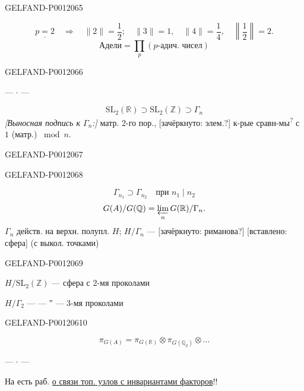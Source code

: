 \begin{GelfandAdjacentEvidence}{GELFAND-P001206}{5}

\[
\underline{p=2}\quad\Rightarrow\quad
\|2\|=\frac12;\quad\|3\|=1,\quad\|4\|=\frac14,\quad
\left\|\frac12\right\|=2.
\]
\[
\text{Адели}=\prod_p(\text{\(p\)-адич. чисел})
\]
\end{GelfandAdjacentEvidence}
\begin{GelfandAdjacentEvidence}{GELFAND-P001206}{6}

\begin{center}--- \(\cdot\) ---\end{center}
\[
\mathrm{SL}_2(\mathbb R)\supset\mathrm{SL}_2(\mathbb Z)\supset\Gamma_n
\]
\textit{[Выносная подпись к \(\Gamma_n\):]} матр. 2-го пор.,
[зачёркнуто: элем.?] к-рые сравн-мы\textsuperscript{?} с \(1\) (матр.) \(\bmod n\).
\end{GelfandAdjacentEvidence}
\begin{GelfandAdjacentEvidence}{GELFAND-P001206}{7}

\end{GelfandAdjacentEvidence}
\begin{GelfandAdjacentEvidence}{GELFAND-P001206}{8}

\[
\Gamma_{n_1}\supset\Gamma_{n_2}\quad\text{при }n_1\mid n_2
\]
\[
G(A)/G(\mathbb Q)=\varprojlim_n G(\mathbb R)/\Gamma_n.
\]
\(\Gamma_n\) действ. на верхн. полупл. \(H\); \(H/\Gamma_n\) ---
[зачёркнуто: риманова?] [вставлено: сфера] (с выкол. точками)
\end{GelfandAdjacentEvidence}
\begin{GelfandAdjacentEvidence}{GELFAND-P001206}{9}


\(H/\mathrm{SL}_2(\mathbb Z)\) --- сфера с 2-мя проколами

\(H/\Gamma_2\) --- --- ″ --- 3-мя проколами
\end{GelfandAdjacentEvidence}
\begin{GelfandAdjacentEvidence}{GELFAND-P001206}{10}

\[
\pi_{G(A)}=\pi_{G(\mathbb R)}\otimes\pi_{G(\mathbb Q_2)}\otimes\ldots
\]
\begin{center}--- \(\cdot\) ---\end{center}
 На  есть раб. 
\underline{о связи топ. узлов с инвариантами факторов}!!
\end{GelfandAdjacentEvidence}
